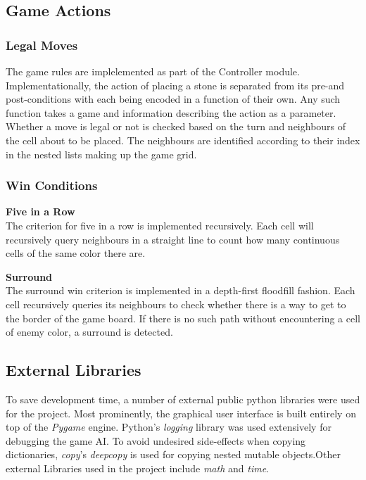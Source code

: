 \subsection{Game Actions}

\subsubsection{Legal Moves}
The game rules are implelemented as part of the Controller module. Implementationally, the action of placing a stone is separated from its pre-and post-conditions with each being encoded in a function of their own. Any such function takes a game and information describing the action as a parameter. 
Whether a move is legal or not is checked based on the turn and neighbours of the cell about to be placed. The neighbours are identified according to their index in the nested lists making up the game grid.


\subsubsection{Win Conditions}

\textbf{Five in a Row}\\
The criterion for five in a row is implemented recursively. Each cell will recursively query neighbours in a straight line to count how many continuous cells of the same color there are.

\textbf{Surround}\\
The surround win criterion is implemented in a depth-first floodfill fashion. Each cell recursively queries its neighbours to check whether there is a way to get to the border of the game board. If there is no such path without encountering a cell of enemy color, a surround is detected.


\subsection{External Libraries}
To save development time, a number of external public python libraries were used for the project. Most prominently, the graphical user interface is built entirely on top of the \textit{Pygame} engine. Python's \textit{logging} library was used extensively for debugging the game AI. To avoid undesired side-effects when copying dictionaries, \textit{copy}'s \textit{deepcopy} is used for copying nested mutable objects.Other external Libraries used in the project include \textit{math} and \textit{time}.